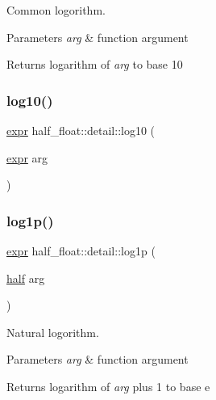 Common logorithm. 
\begin{DoxyParams}{Parameters}
{\em arg} & function argument \\
\hline
\end{DoxyParams}
\begin{DoxyReturn}{Returns}
logarithm of {\itshape arg} to base 10 
\end{DoxyReturn}
\mbox{\label{namespacehalf__float_1_1detail_a968a57d32cab0e05f9e8bf12ea6f9c5a}} 
\subsubsection{\texorpdfstring{log10()}{log10()}\hspace{0.1cm}{\footnotesize\ttfamily [2/2]}}
{\footnotesize\ttfamily \hyperlink{structhalf__float_1_1detail_1_1expr}{expr} half\+\_\+float\+::detail\+::log10 (\begin{DoxyParamCaption}\item[{\hyperlink{structhalf__float_1_1detail_1_1expr}{expr}}]{arg }\end{DoxyParamCaption})\hspace{0.3cm}{\ttfamily [inline]}}

\mbox{\label{namespacehalf__float_1_1detail_aaab6664f3cee88c7c0474396c8ba8219}} 
\subsubsection{\texorpdfstring{log1p()}{log1p()}\hspace{0.1cm}{\footnotesize\ttfamily [1/2]}}
{\footnotesize\ttfamily \hyperlink{structhalf__float_1_1detail_1_1expr}{expr} half\+\_\+float\+::detail\+::log1p (\begin{DoxyParamCaption}\item[{\hyperlink{classhalf__float_1_1half}{half}}]{arg }\end{DoxyParamCaption})\hspace{0.3cm}{\ttfamily [inline]}}

Natural logorithm. 
\begin{DoxyParams}{Parameters}
{\em arg} & function argument \\
\hline
\end{DoxyParams}
\begin{DoxyReturn}{Returns}
logarithm of {\itshape arg} plus 1 to base e 
\end{DoxyReturn}
\mbox{\label{namespacehalf__float_1_1detail_a427f2f960568816873d1f80f0a464232}} 
